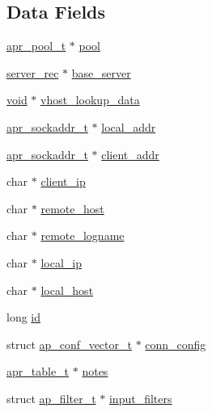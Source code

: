 \subsection*{Data Fields}
\begin{DoxyCompactItemize}
\item 
\hyperlink{structapr__pool__t}{apr\+\_\+pool\+\_\+t} $\ast$ \hyperlink{structconn__rec_a1dc5f31c7afc4a6f9c4ede0daea8cd1d}{pool}
\item 
\hyperlink{structserver__rec}{server\+\_\+rec} $\ast$ \hyperlink{structconn__rec_a1e199eb6e4e1617e94dd03b9cfaa83c8}{base\+\_\+server}
\item 
\hyperlink{group__MOD__ISAPI_gacd6cdbf73df3d9eed42fa493d9b621a6}{void} $\ast$ \hyperlink{structconn__rec_ad93afd204be704378f53e8dd4bc60b9d}{vhost\+\_\+lookup\+\_\+data}
\item 
\hyperlink{structapr__sockaddr__t}{apr\+\_\+sockaddr\+\_\+t} $\ast$ \hyperlink{structconn__rec_a221970681f89eb91eaa5ae591b606dd5}{local\+\_\+addr}
\item 
\hyperlink{structapr__sockaddr__t}{apr\+\_\+sockaddr\+\_\+t} $\ast$ \hyperlink{structconn__rec_a182fbb82669057b3ddafaf9e3075a745}{client\+\_\+addr}
\item 
char $\ast$ \hyperlink{structconn__rec_a792faf741c8f0f87587089e194360fba}{client\+\_\+ip}
\item 
char $\ast$ \hyperlink{structconn__rec_ac42b1d296a58fc8053c3bacb26cc2e25}{remote\+\_\+host}
\item 
char $\ast$ \hyperlink{structconn__rec_a0e9331e0c82b14e18fbb704657230867}{remote\+\_\+logname}
\item 
char $\ast$ \hyperlink{structconn__rec_add15ebc9e65901c998b2daeb8c59485c}{local\+\_\+ip}
\item 
char $\ast$ \hyperlink{structconn__rec_a9103b4e4f0f045c34e7f1486812defd5}{local\+\_\+host}
\item 
long \hyperlink{structconn__rec_af90d018c333fca6f3ef0f29375b86dc1}{id}
\item 
struct \hyperlink{group__APACHE__CORE__CONFIG_ga614684670dbf748a70ac6bad272da59c}{ap\+\_\+conf\+\_\+vector\+\_\+t} $\ast$ \hyperlink{structconn__rec_ad7095a63f14895cb234525086dd48e0c}{conn\+\_\+config}
\item 
\hyperlink{structapr__table__t}{apr\+\_\+table\+\_\+t} $\ast$ \hyperlink{structconn__rec_a7ca7fb2d3bb81f91764bc960686a4fcf}{notes}
\item 
struct \hyperlink{structap__filter__t}{ap\+\_\+filter\+\_\+t} $\ast$ \hyperlink{structconn__rec_a27bcfa99aac415734fedbb540ab7a3e7}{input\+\_\+filters}

\end{DoxyCompactItemize}
